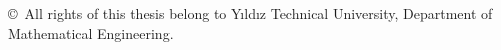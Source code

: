 \thispagestyle{plain}
\vspace*{\fill}
\noindent
\begin{minipage}{\textwidth}
\fontsize{12}{14}\selectfont
\raggedright
\copyright\ All rights of this thesis belong to Yıldız Technical University, Department of Mathematical Engineering.
\end{minipage}
\vspace*{1cm}
\clearpage